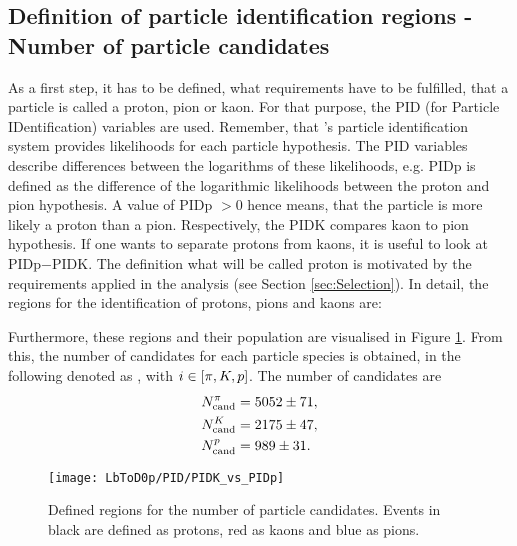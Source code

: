 \subsection{Definition of particle identification regions - Number of particle candidates}
\label{sec:PIDCalib_Ncand}
As a first step, it has to be defined, what requirements have to be fulfilled, that a particle is called a proton, pion or kaon.
For that purpose, the PID (for Particle IDentification) variables are used.
Remember, that \lhcb's particle identification system provides likelihoods for each particle hypothesis.
The PID variables describe differences between the logarithms of these likelihoods, e.g. PIDp is defined as the difference of the logarithmic likelihoods between the proton and pion hypothesis.
A value of PIDp $>0$ hence means, that the particle is more likely a proton than a pion.
Respectively, the PIDK compares kaon to pion hypothesis.
If one wants to separate protons from kaons, it is useful to look at PIDp$-$PIDK.
The definition what will be called proton is motivated by the requirements applied in the analysis (see Section \ref{sec:Selection}). 
In detail, the regions for the identification of protons, pions and kaons are:


Furthermore, these regions and their population are visualised in Figure \ref{fig:PIDregions}. 
From this, the number of candidates for each particle species is obtained, in the following denoted as , with $i \in \left[\pi, {K}, {p}\right]$. 
The number of candidates are
\begin{align}
    N_{\text{cand}}^{\pi}     &= 5052 \pm 71, \\ 
    N_{\text{cand}}^{{K}}   &= 2175 \pm 47, \\ 
    N_{\text{cand}}^{{p}} &= 989 \pm 31.
\end{align}
\begin{figure}[tb]
	\centering
	\texttt{[image: LbToD0p/PID/PIDK\_vs\_PIDp]}
	\caption{Defined regions for the number of particle candidates.
             Events in black are defined as protons, red as kaons and blue as pions.}
	\label{fig:PIDregions}
\end{figure}

